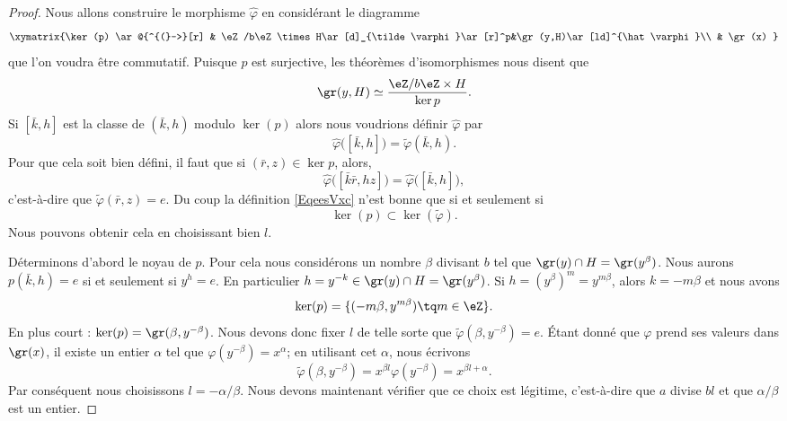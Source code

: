 \begin{proof}
    Nous allons construire le morphisme \( \hat \varphi\) en considérant le diagramme
    \begin{equation}
    \xymatrix{%
    \ker(p) \ar@{^{(}->}[r]        &   \eZ/b\eZ\times H\ar[d]_{\tilde \varphi}\ar[r]^p&\gr(y,H)\ar[ld]^{\hat \varphi}\\
          &   \gr(x)
       }
    \end{equation}
    que l'on voudra être commutatif. Puisque \( p\) est surjective, les théorèmes d'isomorphismes nous disent que
    \begin{equation}
        \gr(y,H)\simeq\frac{ \eZ/b\eZ\times H }{ \ker p }.
    \end{equation}
    Si \( [\bar k,h]\) est la classe de \( (\bar k,h)\) modulo \( \ker(p)\) alors nous voudrions définir \( \hat \varphi\) par
    \begin{equation}        \label{EqeesVxc}
        \hat\varphi\big( [\bar k,h] \big)=\tilde \varphi(\bar k,h).
    \end{equation}
    Pour que cela soit bien défini, il faut que si \( (\bar r,z)\in \ker p\), alors,
    \begin{equation}
        \hat\varphi\big( [\bar k\bar r,hz] \big)=\hat\varphi\big( [\bar k,h] \big),
    \end{equation}
    c'est-à-dire que \( \tilde \varphi(\bar r,z)=e\). Du coup la définition \eqref{EqeesVxc} n'est bonne que si et seulement si
    \begin{equation}
        \ker(p)\subset\ker(\tilde\varphi ).
    \end{equation}
    Nous pouvons obtenir cela en choisissant bien \( l\).

    Déterminons d'abord le noyau de \( p\). Pour cela nous considérons un nombre \( \beta\) divisant \( b\) tel que \( \gr(y)\cap H=\gr(y^{\beta})\). Nous aurons \( p(\bar k,h)=e\) si et seulement si \( y^h=e\). En particulier \( h=y^{-k}\in\gr(y)\cap H=\gr(y^{\beta})\). Si \( h=(y^{\beta})^m=y^{m\beta}\), alors \( k=-m\beta\) et nous avons
    \begin{equation}
        \ker(p)=\{ (-m\beta,y^{m\beta})\tq m\in \eZ \}.
    \end{equation}
    En plus court : \( \ker(p)=\gr(\beta,y^{-\beta})\). Nous devons donc fixer \( l\) de telle sorte que \( \tilde \varphi(\beta,y^{-\beta})=e\). Étant donné que \( \varphi\) prend ses valeurs dans \( \gr(x)\), il existe un entier \( \alpha\) tel que \( \varphi(y^{-\beta})=x^{\alpha}\); en utilisant cet \( \alpha\), nous écrivons
    \begin{equation}
        \tilde \varphi(\beta,y^{-\beta})=x^{\beta l}\varphi(y^{-\beta})=x^{\beta l+\alpha}.
    \end{equation}
    Par conséquent nous choisissons \( l=-\alpha/\beta\). Nous devons maintenant vérifier que ce choix est légitime, c'est-à-dire que \( a\) divise \( bl\) et que \( \alpha/\beta\) est un entier.


\end{proof}

